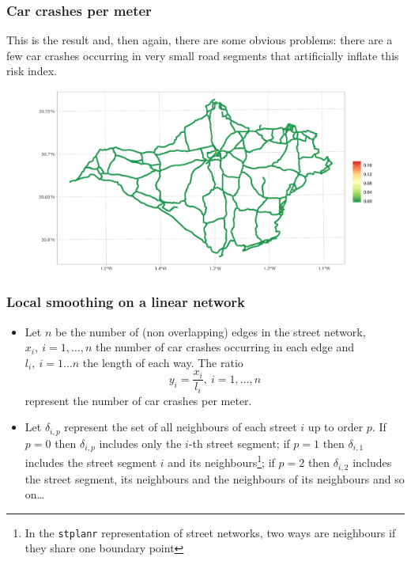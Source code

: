 \documentclass[c,10pt,pdftex]{beamer}
\begin{document}
\begin{frame}
\frametitle{Car crashes per meter}
\vspace{-0.25cm}
This is the result and, then again, there are some obvious problems: there are a few car crashes occurring in very small road segments that artificially inflate this risk index.  
\begin{figure}
	\centering
	\includegraphics[width=\linewidth]{images/car_crashes_per_meter}
\end{figure}
\end{frame}

\begin{frame}
\frametitle{Local smoothing on a linear network}
\vspace{-0.75cm}
\begin{itemize}
	\setlength\itemsep{1em}
	\item Let $n$ be the number of (non overlapping) edges in the street network, $x_i, \ i = 1,\dots,n$ the number of car crashes occurring in each edge and $l_i, \ i = 1\dots n$ the length of each way. The ratio 
	\[
	y_i = \frac{x_i}{l_i}, \ i = 1, \dots, n
	\] 
	represent the number of car crashes per meter. 
	
	\item Let $\delta_{i, p}$ represent the set of all neighbours of each street $i$ up to order $p$. If $p = 0$ then $\delta_{i, p}$ includes only the $i$-th street segment; if $p = 1$ then $\delta_{i, 1}$ includes the street segment $i$ and its neighbours\footnote{In the \texttt{stplanr} representation of street networks, two ways are neighbours if they share one boundary point}; if $p = 2$ then $\delta_{i,2}$ includes the street segment, its neighbours and the neighbours of its neighbours and so on\dots
\end{itemize}
\end{frame}
\end{document}
